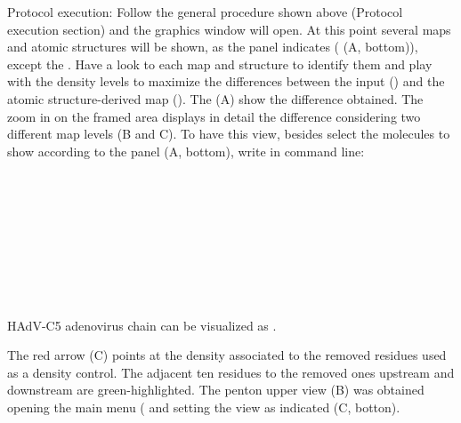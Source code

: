 \begin{itemize}
                        Protocol execution: Follow the general procedure shown above (Protocol execution section) and the \chimera graphics window will open. At this point several maps and atomic structures will be shown, as the  panel indicates ( (A, bottom)), except the  . Have a look to each map and structure to identify them and play with the density levels to maximize the differences between the input  () and the  atomic structure-derived map (). The  (A) show the difference  obtained. The zoom in on the framed area displays in detail the difference considering two different map levels (B and C). To have this view, besides select the molecules to show according to the  panel (A, bottom), write in \chimera command line:\\
                        \\
                        \\
                        \\
                        \\
                        \\
                        \\
                        \\
                        \\
                        \\
                        \ttt
                        HAdV-C5 adenovirus chain  can be visualized as  .  
                        
                        
                        The red arrow (C) points at the density associated to the removed residues used as a density control. The adjacent ten residues to the removed ones upstream and downstream are green-highlighted. The penton upper view (B) was obtained opening the \chimera main menu ( and setting the view as indicated (C, botton). 
                            

\end{itemize}
